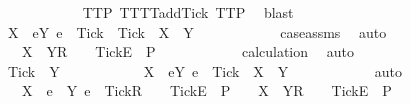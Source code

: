 \begin{isabellebody}
\ \ \ \ \ \ \ \ \ \ \isamarkupfalse%
\ TT{}{\isacharunderscore}P\ TT{}{\isacharunderscore}TT{}{\isacharunderscore}add{\isacharunderscore}Tick\ TT{}{\isacharunderscore}P\ \isamarkupfalse%
\ blast\isanewline
\ \ \ \ \ \ \ \ \isamarkupfalse%
\ \isamarkupfalse%
\ {\isachardoublequoteopen}X\ {\isasymunion}\ {\isacharbraceleft}e{\isasymin}Y{\isachardot}\ e\ {\isasymnoteq}\ Tick{\isacharbraceright}\ {\isasymunion}\ {\isacharbraceleft}Tick{\isacharbraceright}\ {\isacharequal}\ X\ {\isasymunion}\ Y{\isachardoublequoteclose}\isanewline
\ \ \ \ \ \ \ \ \ \ \isamarkupfalse%
\ case{\isacharunderscore}assms{}{\isacharparenleft}{}{\isacharparenright}\ \isamarkupfalse%
\ auto\isanewline
\ \ \ \ \ \ \ \ \isamarkupfalse%
\ \isamarkupfalse%
\ {\isachardoublequoteopen}{\isasymrho}\ {\isacharat}\ {\isacharbrackleft}X\ {\isasymunion}\ Y{\isacharbrackright}\isactrlsub R\ {\isacharhash}\ {\isasymsigma}{\isacharprime}\ {\isacharat}\ {\isacharbrackleft}{\isacharbrackleft}Tick{\isacharbrackright}\isactrlsub E{\isacharbrackright}\ {\isasymin}\ P{\isachardoublequoteclose}\isanewline
\ \ \ \ \ \ \ \ \ \ \isamarkupfalse%
\ calculation\ \isamarkupfalse%
\ auto\isanewline
\ \ \ \ \ \ \isamarkupfalse%
\isanewline
\ \ \ \ \ \ \ \ \isamarkupfalse%
\ {\isachardoublequoteopen}Tick\ {\isasymnotin}\ Y{\isachardoublequoteclose}\isanewline
\ \ \ \ \ \ \ \ \isamarkupfalse%
\ \isamarkupfalse%
\ {\isachardoublequoteopen}X\ {\isasymunion}\ {\isacharbraceleft}e{\isasymin}Y{\isachardot}\ e\ {\isasymnoteq}\ Tick{\isacharbraceright}\ {\isacharequal}\ X\ {\isasymunion}\ Y{\isachardoublequoteclose}\isanewline
\ \ \ \ \ \ \ \ \ \ \isamarkupfalse%
\ auto\isanewline
\ \ \ \ \ \ \ \ \isamarkupfalse%
\ \isamarkupfalse%
\ {\isachardoublequoteopen}{\isasymrho}\ {\isacharat}\ {\isacharbrackleft}X\ {\isasymunion}\ {\isacharbraceleft}e\ {\isasymin}\ Y{\isachardot}\ e\ {\isasymnoteq}\ Tick{\isacharbraceright}{\isacharbrackright}\isactrlsub R\ {\isacharhash}\ {\isasymsigma}{\isacharprime}\ {\isacharat}\ {\isacharbrackleft}{\isacharbrackleft}Tick{\isacharbrackright}\isactrlsub E{\isacharbrackright}\ {\isasymin}\ P\ {\isasymLongrightarrow}\ {\isasymrho}\ {\isacharat}\ {\isacharbrackleft}X\ {\isasymunion}\ Y{\isacharbrackright}\isactrlsub R\ {\isacharhash}\ {\isasymsigma}{\isacharprime}\ {\isacharat}\ {\isacharbrackleft}{\isacharbrackleft}Tick{\isacharbrackright}\isactrlsub E{\isacharbrackright}\ {\isasymin}\ P{\isachardoublequoteclose}\isanewline

\end{isabellebody}
